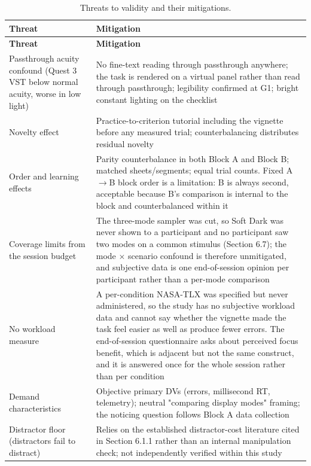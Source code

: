 \begin{longtable}{p{}|p{}}
\caption{Threats to validity and their mitigations.}\\
\hline
\textbf{Threat} & \textbf{Mitigation} \\
\hline
\endfirsthead
\hline
\textbf{Threat} & \textbf{Mitigation} \\
\hline
\endhead
\hline
Passthrough acuity confound (Quest 3 VST below normal acuity, worse in low light) & No fine-text reading through passthrough anywhere; the task is rendered on a virtual panel rather than read through passthrough; legibility confirmed at G1; bright constant lighting on the checklist \\
Novelty effect & Practice-to-criterion tutorial including the vignette before any measured trial; counterbalancing distributes residual novelty \\
Order and learning effects & Parity counterbalance in both Block A and Block B; matched sheets/segments; equal trial counts. Fixed A$\rightarrow$B block order is a limitation: B is always second, acceptable because B's comparison is internal to the block and counterbalanced within it \\
Coverage limits from the session budget & The three-mode sampler was cut, so Soft Dark was never shown to a participant and no participant saw two modes on a common stimulus (Section 6.7); the mode $\times$ scenario confound is therefore unmitigated, and subjective data is one end-of-session opinion per participant rather than a per-mode comparison \\
No workload measure & A per-condition NASA-TLX was specified but never administered, so the study has no subjective workload data and cannot say whether the vignette made the task feel easier as well as produce fewer errors. The end-of-session questionnaire asks about perceived focus benefit, which is adjacent but not the same construct, and it is answered once for the whole session rather than per condition \\
Demand characteristics & Objective primary DVs (errors, millisecond RT, telemetry); neutral "comparing display modes" framing; the noticing question follows Block A data collection \\
Distractor floor (distractors fail to distract) & Relies on the established distractor-cost literature cited in Section 6.1.1 \citep[N = 66]{ai2025} rather than an internal manipulation check; not independently verified within this study \\

\end{longtable}
